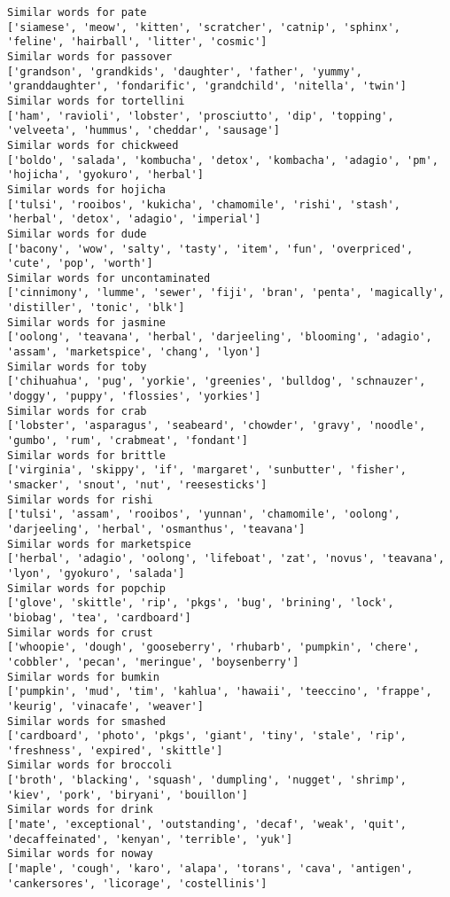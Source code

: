 \documentclass[11pt]{article}
\begin{document}
\begin{Verbatim}[commandchars=\\\{\}]
Similar words for pate
['siamese', 'meow', 'kitten', 'scratcher', 'catnip', 'sphinx', 'feline', 'hairball', 'litter', 'cosmic']
Similar words for passover
['grandson', 'grandkids', 'daughter', 'father', 'yummy', 'granddaughter', 'fondarific', 'grandchild', 'nitella', 'twin']
Similar words for tortellini
['ham', 'ravioli', 'lobster', 'prosciutto', 'dip', 'topping', 'velveeta', 'hummus', 'cheddar', 'sausage']
Similar words for chickweed
['boldo', 'salada', 'kombucha', 'detox', 'kombacha', 'adagio', 'pm', 'hojicha', 'gyokuro', 'herbal']
Similar words for hojicha
['tulsi', 'rooibos', 'kukicha', 'chamomile', 'rishi', 'stash', 'herbal', 'detox', 'adagio', 'imperial']
Similar words for dude
['bacony', 'wow', 'salty', 'tasty', 'item', 'fun', 'overpriced', 'cute', 'pop', 'worth']
Similar words for uncontaminated
['cinnimony', 'lumme', 'sewer', 'fiji', 'bran', 'penta', 'magically', 'distiller', 'tonic', 'blk']
Similar words for jasmine
['oolong', 'teavana', 'herbal', 'darjeeling', 'blooming', 'adagio', 'assam', 'marketspice', 'chang', 'lyon']
Similar words for toby
['chihuahua', 'pug', 'yorkie', 'greenies', 'bulldog', 'schnauzer', 'doggy', 'puppy', 'flossies', 'yorkies']
Similar words for crab
['lobster', 'asparagus', 'seabeard', 'chowder', 'gravy', 'noodle', 'gumbo', 'rum', 'crabmeat', 'fondant']
Similar words for brittle
['virginia', 'skippy', 'if', 'margaret', 'sunbutter', 'fisher', 'smacker', 'snout', 'nut', 'reesesticks']
Similar words for rishi
['tulsi', 'assam', 'rooibos', 'yunnan', 'chamomile', 'oolong', 'darjeeling', 'herbal', 'osmanthus', 'teavana']
Similar words for marketspice
['herbal', 'adagio', 'oolong', 'lifeboat', 'zat', 'novus', 'teavana', 'lyon', 'gyokuro', 'salada']
Similar words for popchip
['glove', 'skittle', 'rip', 'pkgs', 'bug', 'brining', 'lock', 'biobag', 'tea', 'cardboard']
Similar words for crust
['whoopie', 'dough', 'gooseberry', 'rhubarb', 'pumpkin', 'chere', 'cobbler', 'pecan', 'meringue', 'boysenberry']
Similar words for bumkin
['pumpkin', 'mud', 'tim', 'kahlua', 'hawaii', 'teeccino', 'frappe', 'keurig', 'vinacafe', 'weaver']
Similar words for smashed
['cardboard', 'photo', 'pkgs', 'giant', 'tiny', 'stale', 'rip', 'freshness', 'expired', 'skittle']
Similar words for broccoli
['broth', 'blacking', 'squash', 'dumpling', 'nugget', 'shrimp', 'kiev', 'pork', 'biryani', 'bouillon']
Similar words for drink
['mate', 'exceptional', 'outstanding', 'decaf', 'weak', 'quit', 'decaffeinated', 'kenyan', 'terrible', 'yuk']
Similar words for noway
['maple', 'cough', 'karo', 'alapa', 'torans', 'cava', 'antigen', 'cankersores', 'licorage', 'costellinis']

\end{Verbatim}
\end{document}
